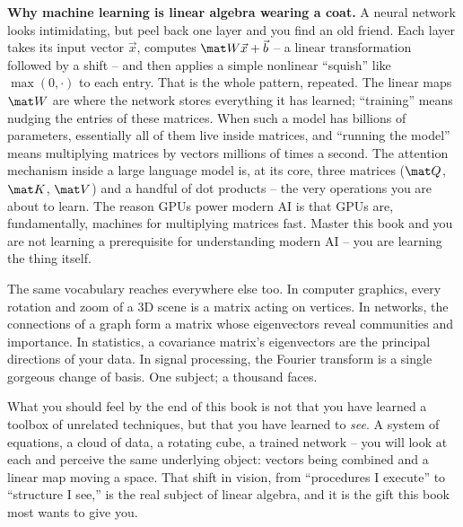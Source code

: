 \begin{applicationbox}
\textbf{Why machine learning is linear algebra wearing a coat.} A neural network looks intimidating,
but peel back one layer and you find an old friend. Each layer takes its input vector $\vec x$,
computes $\mat W\vec x + \vec b$ -- a linear transformation followed by a shift -- and then applies a
simple nonlinear ``squish'' like $\max(0,\cdot)$ to each entry. That is the whole pattern, repeated.
The linear maps $\mat W$ are where the network stores everything it has learned; ``training'' means
nudging the entries of these matrices. When such a model has billions of parameters, essentially all of
them live inside matrices, and ``running the model'' means multiplying matrices by vectors millions of
times a second. The attention mechanism inside a large language model is, at its core, three matrices
($\mat Q$, $\mat K$, $\mat V$) and a handful of dot products -- the very operations you are about to
learn. The reason GPUs power modern AI is that GPUs are, fundamentally, machines for multiplying
matrices fast. Master this book and you are not learning a prerequisite for understanding modern AI --
you are learning the thing itself.
\end{applicationbox}

The same vocabulary reaches everywhere else too. In computer graphics, every rotation and zoom of a
3D scene is a matrix acting on vertices. In networks, the connections of a graph form a matrix whose
eigenvectors reveal communities and importance. In statistics, a covariance matrix's eigenvectors are
the principal directions of your data. In signal processing, the Fourier transform is a single
gorgeous change of basis. One subject; a thousand faces.

\begin{aestheticbox}
What you should feel by the end of this book is not that you have learned a toolbox of unrelated
techniques, but that you have learned to \emph{see}. A system of equations, a cloud of data, a rotating
cube, a trained network -- you will look at each and perceive the same underlying object: vectors being
combined and a linear map moving a space. That shift in vision, from ``procedures I execute'' to
``structure I see,'' is the real subject of linear algebra, and it is the gift this book most wants to
give you.
\end{aestheticbox}

